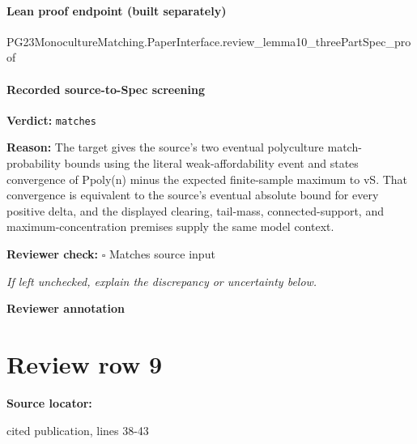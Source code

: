 \documentclass[10pt]{article}
\newcommand{\reviewerbox}{%
  \par\noindent\fbox{\parbox{0.96\linewidth}{\rule{0pt}{0.38in}}}\par
}
\newcommand{\reviewmatch}[1]{%
  \par\noindent\textbf{Reviewer check:} $\square$\; #1\par
  \noindent\emph{If left unchecked, explain the discrepancy or uncertainty below.}\par
}
\begin{document}
\paragraph{Lean proof endpoint (built separately)}\begin{ReviewVerbatim}
PG23MonocultureMatching.PaperInterface.review_lemma10_threePartSpec_proof
\end{ReviewVerbatim}

\paragraph{Recorded source-to-Spec screening}
\textbf{Verdict:} \texttt{matches}
\\
{\raggedright
\textbf{Reason:} The target gives the source's two eventual polyculture match-\allowbreak{}probability bounds using the literal weak-\allowbreak{}affordability event and states convergence of Ppoly(n) minus the expected finite-\allowbreak{}sample maximum to vS.\allowbreak{} That convergence is equivalent to the source's eventual absolute bound for every positive delta, and the displayed clearing, tail-\allowbreak{}mass, connected-\allowbreak{}support, and maximum-\allowbreak{}concentration premises supply the same model context.\allowbreak{}
\par}
\reviewmatch{Matches source input}
\noindent\textbf{Reviewer annotation}\par
\reviewerbox
\clearpage
\hypertarget{source-claim-380c644168b086fa}{}
\section*{Review row 9}
\textbf{Source locator:} {\footnotesize\raggedright cited publication, lines 38-\allowbreak{}43\par}
\end{document}
